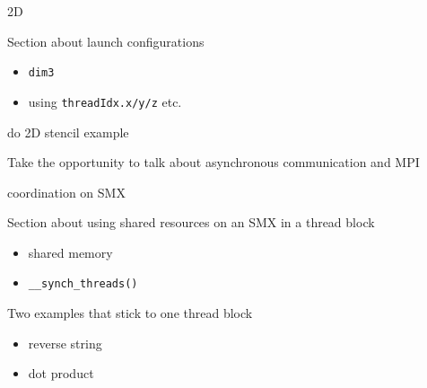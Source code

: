 \documentclass[aspectratio=43]{beamer}
\newcommand{\lst}[1]{\colorbox{white!90!blue}{\lstinline!#1!}}
\begin{document}

\begin{frame}[fragile]{2D}
    \begin{info}{}
        Section about launch configurations
        \begin{itemize}
            \item \lst{dim3}
            \item using \lst{threadIdx.x/y/z} etc.
        \end{itemize}
        do 2D stencil example

        Take the opportunity to talk about asynchronous communication and MPI
    \end{info}

\end{frame}

\begin{frame}[fragile]{coordination on SMX}
    \begin{info}{}
        Section about using shared resources on an SMX in a thread block
        \begin{itemize}
            \item shared memory
            \item \lst{__synch_threads()}
        \end{itemize}
        Two examples that stick to one thread block
        \begin{itemize}
            \item reverse string
            \item dot product
        \end{itemize}
    \end{info}

\end{frame}
\end{document}
